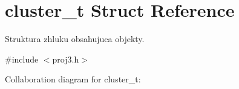 \hypertarget{structcluster__t}{}\section{cluster\+\_\+t Struct Reference}
\label{structcluster__t}


Struktura zhluku obsahujuca objekty.  




{\ttfamily \#include $<$proj3.\+h$>$}



Collaboration diagram for cluster\+\_\+t\+:
